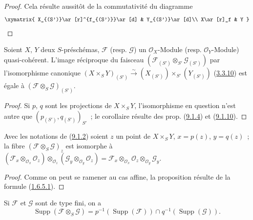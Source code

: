 \begin{proof}
Cela résulte aussitôt de la commutativité du diagramme
\[
  \xymatrix{
    X_{(S')}\ar[r]^{f_{(S')}}\ar[d] &
    Y_{(S')}\ar[d]\\
    X\ar[r]_f &
    Y
  }
\]
\end{proof}

\begin{corollary}[9.1.11]
\label{I.9.1.11-fr}
Soient $X$, $Y$ deux $S$-préschémas, $\mathscr{F}$ (resp. $\mathscr{G}$) un
$\mathscr{O}_X$-Module (resp. $\mathscr{O}_Y$-Module) quasi-cohérent.
L'image réciproque du faisceau
$(\mathscr{F}_{(S')}\otimes_{S'}\mathscr{G}_{(S')})$ par l'isomorphisme
canonique
$(X\times_S Y)_{(S')}\xrightarrow{\sim}
(X_{(S')})\times_{S'}(Y_{(S')})$
(\hyperref[I.3.3.10-fr]{3.3.10}) est égale à
$(\mathscr{F}\otimes_S\mathscr{G})_{(S')}$.
\end{corollary}

\begin{proof}
Si $p$, $q$ sont les projections de $X\times_S Y$, l'isomorphisme en
question n'est autre que $(p_{(S')},q_{(S')})_{S'}$~; le corollaire résulte
des prop. (\hyperref[I.9.1.4-fr]{9.1.4}) et
(\hyperref[I.9.1.10-fr]{9.1.10}).
\end{proof}

\begin{proposition}[9.1.12]
\label{I.9.1.12-fr}
Avec les notations de (\hyperref[I.9.1.2-fr]{9.1.2}) soient $z$ un point de
$X\times_S Y$, $x=p(z)$, $y=q(z)$~; la fibre
$(\mathscr{F}\otimes_S\mathscr{G})_z$ est isomorphe à
$(\mathscr{F}_x\otimes_{\mathscr{O}_x}\mathscr{O}_z)
\otimes_{\mathscr{O}_z}
(\mathscr{G}_y\otimes_{\mathscr{O}_y}\mathscr{O}_z)
=\mathscr{F}_x\otimes_{\mathscr{O}_x}\mathscr{O}_z
\otimes_{\mathscr{O}_y}\mathscr{G}_y$.
\end{proposition}

\begin{proof}
Comme on peut se ramener au cas affine, la proposition résulte de la formule
(\hyperref[I.1.6.5.1-fr]{1.6.5.1}).
\end{proof}

\begin{corollary}[9.1.13]
\label{I.9.1.13-fr}
Si $\mathscr{F}$ et $\mathscr{G}$ sont de type fini, on a
\[
  \operatorname{Supp}(\mathscr{F}\otimes_S\mathscr{G})
  =p^{-1}(\operatorname{Supp}(\mathscr{F}))
  \cap q^{-1}(\operatorname{Supp}(\mathscr{G})).
\]
\end{corollary}

